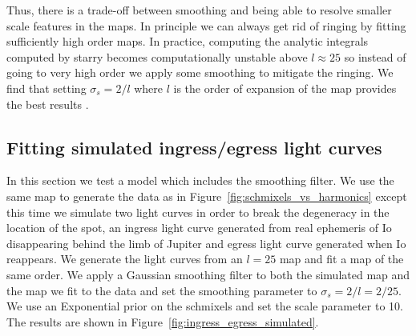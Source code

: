 \documentclass[modern]{aastex62}
\begin{document}
Thus, there is a trade-off between smoothing and being able to resolve smaller scale features
in the maps. 
In principle we can always get rid of ringing by fitting sufficiently high order maps.
In practice, computing the analytic integrals computed by \textsf{starry} becomes computationally unstable above $l\approx 25$ so instead of going to very high order we apply some smoothing to mitigate the ringing.
We find that setting $\sigma_s=2/l$ where $l$ is the order of expansion of the map provides the best results .

\subsection{Fitting simulated ingress/egress light curves}
In this section we test a model which includes the smoothing filter. 
We use the same map to generate the data as in Figure~\ref{fig:schmixels_vs_harmonics} except this time we simulate two light curves in order to break the degeneracy in the location of the spot, an ingress light curve generated from real ephemeris of Io disappearing behind the limb of Jupiter and egress light curve generated when Io reappears.
We generate the light curves from an $l=25$ map and fit a map of the same order. 
We apply a Gaussian smoothing filter to both the simulated map and the map we fit to the data and set the smoothing parameter to $\sigma_s=2/l=2/25$. 
We use an Exponential prior on the schmixels and set the scale parameter to 10.
The results are shown in Figure~\ref{fig:ingress_egress_simulated}.
\end{document}
